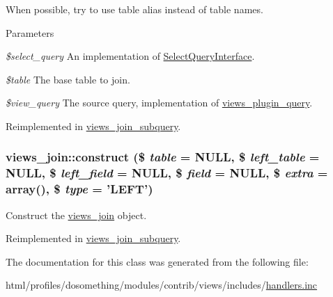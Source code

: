 When possible, try to use table alias instead of table names.


\begin{DoxyParams}{Parameters}
\item[{\em \$select\_\-query}]An implementation of \hyperlink{interfaceSelectQueryInterface}{SelectQueryInterface}. \item[{\em \$table}]The base table to join. \item[{\em \$view\_\-query}]The source query, implementation of \hyperlink{classviews__plugin__query}{views\_\-plugin\_\-query}. \end{DoxyParams}


Reimplemented in \hyperlink{classviews__join__subquery_aced6dd7573a138cd4f527b340fee501e}{views\_\-join\_\-subquery}.\hypertarget{classviews__join_ac6c6e70389e0c59e4b068903ef4950b9}{
\subsubsection[{construct}]{\setlength{\rightskip}{0pt plus 5cm}views\_\-join::construct (\$ {\em table} = {\ttfamily NULL}, \/  \$ {\em left\_\-table} = {\ttfamily NULL}, \/  \$ {\em left\_\-field} = {\ttfamily NULL}, \/  \$ {\em field} = {\ttfamily NULL}, \/  \$ {\em extra} = {\ttfamily array()}, \/  \$ {\em type} = {\ttfamily 'LEFT'})}}
\label{classviews__join_ac6c6e70389e0c59e4b068903ef4950b9}
Construct the \hyperlink{classviews__join}{views\_\-join} object. 

Reimplemented in \hyperlink{classviews__join__subquery_a27a49742ee109b1329adcb86512837ab}{views\_\-join\_\-subquery}.

The documentation for this class was generated from the following file:\begin{DoxyCompactItemize}
\item 
html/profiles/dosomething/modules/contrib/views/includes/\hyperlink{handlers_8inc}{handlers.inc}\end{DoxyCompactItemize}
